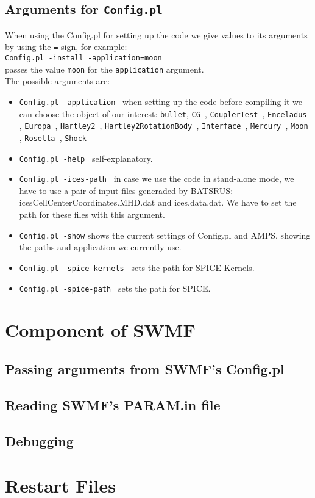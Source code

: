 \subsection{Arguments for {\tt Config.pl}}
When using the Config.pl for setting up the code we give values to its arguments by using the {\tt =} sign, for example:\\
{\tt Config.pl -install -application=moon}\\
passes the value {\tt moon} for the {\tt application} argument.\\
The possible arguments are:
\begin{itemize}
\item {\tt Config.pl -application } when setting up the code before compiling it we can choose the object of our interest: {\tt  bullet}, {\tt CG }, {\tt CouplerTest }, {\tt Enceladus }, {\tt Europa }, {\tt Hartley2 }, {\tt Hartley2RotationBody }, {\tt Interface }, {\tt Mercury }, {\tt Moon }, {\tt Rosetta }, {\tt Shock}\\
\item {\tt Config.pl -help } self-explanatory.\\
\item {\tt Config.pl -ices-path } in case we use the code in stand-alone mode, we have to use a pair of input files generaded by BATSRUS: icesCellCenterCoordinates.MHD.dat and ices.data.dat. We have to set the path for these files with this argument. \\
\item {\tt Config.pl -show} shows the current settings of Config.pl and AMPS, showing the paths and application we currently use.\\
\item {\tt Config.pl -spice-kernels } sets the path for SPICE Kernels.\\
\item {\tt Config.pl -spice-path } sets the path for SPICE.\\
\end{itemize}



\section {Component of SWMF}
\subsection {Passing arguments from SWMF's Config.pl}
\subsection {Reading SWMF's PARAM.in file}
\subsection {Debugging}


\section {Restart Files}


